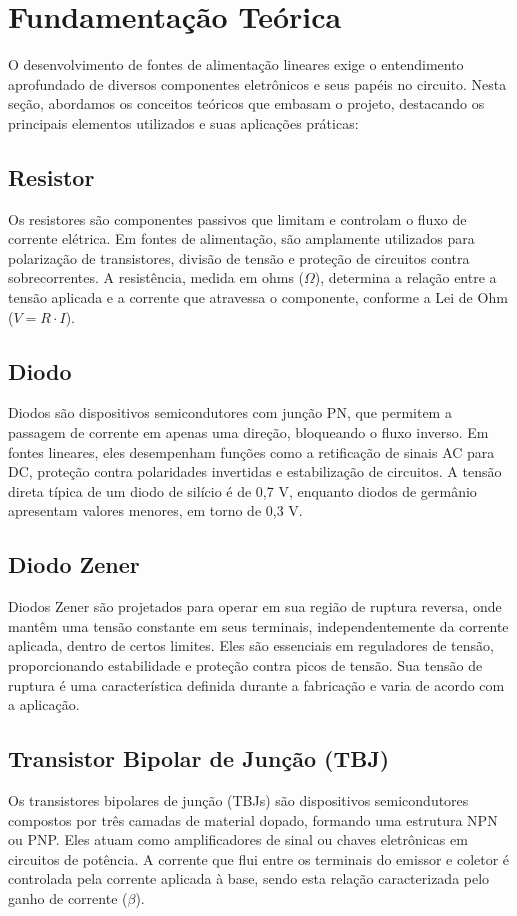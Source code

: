\section{Fundamentação Teórica}  

O desenvolvimento de fontes de alimentação lineares exige o entendimento aprofundado de diversos componentes eletrônicos e seus papéis no circuito. Nesta seção, abordamos os conceitos teóricos que embasam o projeto, destacando os principais elementos utilizados e suas aplicações práticas:  

\subsection{Resistor}  
Os resistores são componentes passivos que limitam e controlam o fluxo de corrente elétrica. Em fontes de alimentação, são amplamente utilizados para polarização de transistores, divisão de tensão e proteção de circuitos contra sobrecorrentes. A resistência, medida em ohms (\(\Omega\)), determina a relação entre a tensão aplicada e a corrente que atravessa o componente, conforme a Lei de Ohm (\(V = R \cdot I\)).  

\subsection{Diodo}  
Diodos são dispositivos semicondutores com junção PN, que permitem a passagem de corrente em apenas uma direção, bloqueando o fluxo inverso. Em fontes lineares, eles desempenham funções como a retificação de sinais AC para DC, proteção contra polaridades invertidas e estabilização de circuitos. A tensão direta típica de um diodo de silício é de 0,7 V, enquanto diodos de germânio apresentam valores menores, em torno de 0,3 V.  

\subsection{Diodo Zener}  
Diodos Zener são projetados para operar em sua região de ruptura reversa, onde mantêm uma tensão constante em seus terminais, independentemente da corrente aplicada, dentro de certos limites. Eles são essenciais em reguladores de tensão, proporcionando estabilidade e proteção contra picos de tensão. Sua tensão de ruptura é uma característica definida durante a fabricação e varia de acordo com a aplicação.  

\subsection{Transistor Bipolar de Junção (TBJ)}  
Os transistores bipolares de junção (TBJs) são dispositivos semicondutores compostos por três camadas de material dopado, formando uma estrutura NPN ou PNP. Eles atuam como amplificadores de sinal ou chaves eletrônicas em circuitos de potência. A corrente que flui entre os terminais do emissor e coletor é controlada pela corrente aplicada à base, sendo esta relação caracterizada pelo ganho de corrente (\(\beta\)).  

